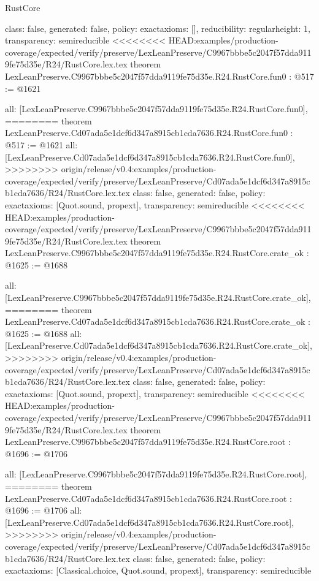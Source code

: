 \begin{lexlean}{RustCore}
\begin{coremodule}
{\begin{coremodule}
{{{  class: false,
  generated: false,
  policy: exact{axioms: []},
  reducibility: regular{height: 1},
  transparency: semireducible
}
<<<<<<<< HEAD:examples/production-coverage/expected/verify/preserve/LexLeanPreserve/C9967bbbe5c2047f57dda9119fe75d35e/R24/RustCore.lex.tex
theorem LexLeanPreserve.C9967bbbe5c2047f57dda9119fe75d35e.R24.RustCore.fun0 : @517 := @1621 {
  all: [LexLeanPreserve.C9967bbbe5c2047f57dda9119fe75d35e.R24.RustCore.fun0],
========
theorem LexLeanPreserve.Cd07ada5e1dcf6d347a8915cb1cda7636.R24.RustCore.fun0 : @517 := @1621 {
  all: [LexLeanPreserve.Cd07ada5e1dcf6d347a8915cb1cda7636.R24.RustCore.fun0],
>>>>>>>> origin/release/v0.4:examples/production-coverage/expected/verify/preserve/LexLeanPreserve/Cd07ada5e1dcf6d347a8915cb1cda7636/R24/RustCore.lex.tex
  class: false,
  generated: false,
  policy: exact{axioms: [Quot.sound, propext]},
  transparency: semireducible
}
<<<<<<<< HEAD:examples/production-coverage/expected/verify/preserve/LexLeanPreserve/C9967bbbe5c2047f57dda9119fe75d35e/R24/RustCore.lex.tex
theorem LexLeanPreserve.C9967bbbe5c2047f57dda9119fe75d35e.R24.RustCore.crate_ok : @1625 := @1688 {
  all: [LexLeanPreserve.C9967bbbe5c2047f57dda9119fe75d35e.R24.RustCore.crate_ok],
========
theorem LexLeanPreserve.Cd07ada5e1dcf6d347a8915cb1cda7636.R24.RustCore.crate_ok : @1625 := @1688 {
  all: [LexLeanPreserve.Cd07ada5e1dcf6d347a8915cb1cda7636.R24.RustCore.crate_ok],
>>>>>>>> origin/release/v0.4:examples/production-coverage/expected/verify/preserve/LexLeanPreserve/Cd07ada5e1dcf6d347a8915cb1cda7636/R24/RustCore.lex.tex
  class: false,
  generated: false,
  policy: exact{axioms: [Quot.sound, propext]},
  transparency: semireducible
}
<<<<<<<< HEAD:examples/production-coverage/expected/verify/preserve/LexLeanPreserve/C9967bbbe5c2047f57dda9119fe75d35e/R24/RustCore.lex.tex
theorem LexLeanPreserve.C9967bbbe5c2047f57dda9119fe75d35e.R24.RustCore.root : @1696 := @1706 {
  all: [LexLeanPreserve.C9967bbbe5c2047f57dda9119fe75d35e.R24.RustCore.root],
========
theorem LexLeanPreserve.Cd07ada5e1dcf6d347a8915cb1cda7636.R24.RustCore.root : @1696 := @1706 {
  all: [LexLeanPreserve.Cd07ada5e1dcf6d347a8915cb1cda7636.R24.RustCore.root],
>>>>>>>> origin/release/v0.4:examples/production-coverage/expected/verify/preserve/LexLeanPreserve/Cd07ada5e1dcf6d347a8915cb1cda7636/R24/RustCore.lex.tex
  class: false,
  generated: false,
  policy: exact{axioms: [Classical.choice, Quot.sound, propext]},
  transparency: semireducible
}

}}}}}
\end{coremodule}}
\end{coremodule}
\end{lexlean}
